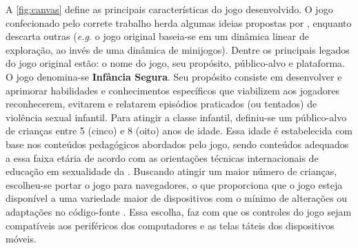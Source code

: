 
A \autoref{fig:canvas} define as principais características do jogo desenvolvido. O jogo confecionado pelo correte trabalho herda algumas ideias propostas por , enquanto descarta outras (\textit{e.g.} o jogo original baseia-se em um dinâmica linear de exploração, ao invés de uma dinâmica de minijogos). Dentre os principais legados do jogo original estão: o nome do jogo, seu propósito, público-alvo e plataforma. O jogo denomina-se \textbf{Infância Segura}. Seu propósito consiste em desenvolver e aprimorar habilidades e conhecimentos específicos que viabilizem aos jogadores reconhecerem, evitarem e relatarem episódios praticados (ou tentados) de violência sexual infantil. Para atingir a classe infantil, definiu-se um público-alvo de crianças entre 5 (cinco) e 8 (oito) anos de idade. Essa idade é estabelecida com base nos conteúdos pedagógicos abordados pelo jogo, sendo conteúdos adequados a essa faixa etária de acordo com as orientações técnicas internacionais de educação em sexualidade da . Buscando atingir um maior número de crianças, escolheu-se portar o jogo para navegadores, o que proporciona que o jogo esteja disponível a uma variedade maior de dispositivos com o mínimo de alterações ou adaptações no código-fonte \cite{carrara2018criancca}. Essa escolha, faz com que os controles do jogo sejam compatíveis aos periféricos dos computadores e as telas táteis dos dispositivos móveis.

